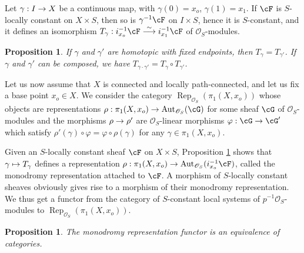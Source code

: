 \documentclass[english]{smfart}
\numberwithin{subsection}{section}
\def\sho{\mathcal{O}}\let\cO\sho
\newcommand{\XS}{X\times S}
\DeclareMathOperator{\Rep}{Rep}
\let\wt\widetilde
\newcommand{\pOS}{p^{-1}\sho_S}
\DeclareMathOperator{\Aut}{Aut}
\numberwithin{equation}{section}
\theoremstyle{plain}
\newtheorem{proposition}[equation]{Proposition}
\theoremstyle{definition}
\def\to{\mathchoice{\longrightarrow}{\rightarrow}{\rightarrow}{\rightarrow}}
\def\mto{\mathchoice{\longmapsto}{\mapsto}{\mapsto}{\mapsto}}
\def\isom{\stackrel{\sim}{\longrightarrow}}
\begin{document}
Let $\gamma:I\to X$ be a continuous map, with $\gamma(0)=x_o$, $\gamma(1)=x_1$. If $\cF$ is $S$-locally constant on $\XS$, then so is $\gamma^{-1}\cF$ on $I\times S$, hence it is $S$-constant, and it defines an isomorphism $T_\gamma:i_{x_o}^{-1}\cF\isom i_{x_1}^{-1}\cF$ of $\sho_S$-modules.

\begin{proposition}\label{prop:monodromy}
If $\gamma$ and $\gamma'$ are homotopic with fixed endpoints, then $T_\gamma=T_{\gamma'}$. If $\gamma$ and $\gamma'$ can be composed, we have $T_{\gamma\cdot\gamma'}=T_\gamma\circ T_{\gamma'}$.
\end{proposition}

\begin{comment}
\begin{proof}
Let $H:I\times I\to X$ be an homotopy between $\gamma$ and $\gamma'$. Then $H^{-1}\cF$ is $S$\nobreakdash-constant and the first statement follows. The second statement is standard.
\end{proof}
\end{comment}

Let us now assume that $X$ is connected and locally path-connected, and let us fix a base point $x_o\in X$. We consider the category $\Rep_{\sho_S}(\pi_1(X,x_o))$ whose objects are representations $\rho:\pi_1(X,x_o)\to\Aut_{\sho_S}(\cG)$ for some sheaf $\cG$ of $\sho_S$-modules and the morphisms $\rho\to\rho'$ are $\sho_S$-linear morphisms $\varphi:\cG\to\cG'$ which satisfy $\rho'(\gamma)\circ\varphi=\varphi\circ\rho(\gamma)$ for any $\gamma\in\pi_1(X,x_o)$.

Given an $S$-locally constant sheaf $\cF$ on $\XS$, Proposition \ref{prop:monodromy} shows that $\gamma\mto\nobreak T_\gamma$ defines a representation $\rho:\pi_1(X,x_o)\to\Aut_{\sho_S}(i_{x_o}^{-1}\cF)$, called the monodromy representation attached to $\cF$. A morphism of $S$-locally constant sheaves obviously gives rise to a morphism of their monodromy representation. We thus get a functor from the category of $S$-constant local systems of $\pOS$-modules to $\Rep_{\sho_S}(\pi_1(X,x_o))$.

\begin{proposition}\label{prop:monodromyrepr}
The monodromy representation functor is an equivalence of categories.
\end{proposition}

\begin{comment}
\begin{proof}
Let us indicate the construction of a quasi-inverse functor. Let us choose a universal covering $(\wt X,\wt x_o)$ of $(X,x_o)$. The fundamental group $\pi_1(X,x_o)$ acts on~$\wt X$ and, through $\rho$, on $\wt X\times\wt\cG$, where $\wt\cG$ is the sheaf space of $\cG$. Then the quotient $(\wt X\times\wt\cG)/\pi_1$ is a sheaf space over $\XS$, which corresponds to an $S$-locally constant sheaf $\cF$.
\end{proof}
\end{comment}
\end{document}

